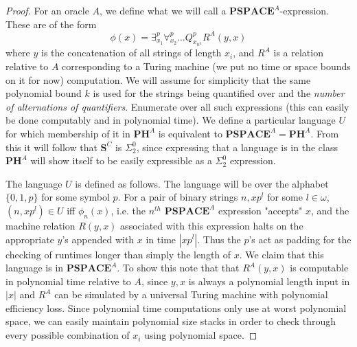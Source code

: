 \documentclass{article}
\theoremstyle{definition}
\theoremstyle{plain}
\theoremstyle{theorem}
\begin{document}
\begin{proof}
	For an oracle $A$, we define what we will call a $\bm{PSPACE}^A$-expression. These are of the form 
	\[ \phi(x) = \exists^p_{x_1} \forall^p_{x_2} \ldots Q^p_{x_{n^k}} R^A(y,x) \]
	where $y$ is the concatenation of all strings of length $x_i$, and $R^A$ is a relation relative to $A$ corresponding to a Turing machine (we put no time or space bounds on it for now) computation. We will assume for simplicity that the same polynomial bound $k$ is used for the strings being quantified over and the \emph{number of alternations of quantifiers}. Enumerate over all such expressions (this can easily be done computably and in polynomial time). We define a particular language $U$ for which membership of it in $\bm{PH}^A$ is equivalent to $\bm{PSPACE}^A = \bm{PH}^A$. From this it will follow that $\bm{S}^C$ is $\Sigma^0_2$, since expressing that a language is in the class $\bm{PH}^A$ will show itself to be easily expressible as a $\Sigma^0_2$ expression. \par 
	The language $U$ is defined as follows. The language will be over the alphabet $\{0,1,p\}$ for some symbol $p$. For a pair of binary strings $n,xp^l$ for some $l \in \omega$, $(n,xp^l) \in U$ iff $\phi_n(x)$, i.e. the $n^{th}$ $\bm{PSPACE}^A$ expression "accepts" $x$, and the machine relation $R(y,x)$ associated with this expression halts on the appropriate $y$'s appended with $x$ in time $|xp^l|$. Thus the $p$'s act as padding for the checking of runtimes longer than simply the length of $x$. We claim that this language is in $\bm{PSPACE}^A$. To show this note that that $R^A(y,x)$ is computable in polynomial time relative to $A$, since $y,x$ is always a polynomial length input in $|x|$ and $R^A$ can be simulated by a universal Turing machine with polynomial efficiency loss. Since polynomial time computations only use at worst polynomial space, we can easily maintain polynomial size stacks in order to check through every possible combination of $x_i$ using polynomial space. \par 

\end{proof}
\end{document}
